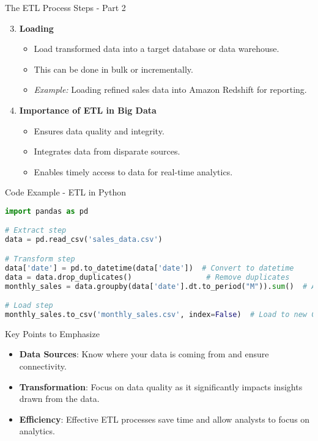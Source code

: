 \documentclass[aspectratio=169]{beamer}
\begin{document}
\begin{frame}{The ETL Process Steps - Part 2}
    \begin{enumerate}
        \setcounter{enumi}{2}
        \item \textbf{Loading}
        \begin{itemize}
            \item Load transformed data into a target database or data warehouse.
            \item This can be done in bulk or incrementally.
            \item \textit{Example:} Loading refined sales data into Amazon Redshift for reporting.
        \end{itemize}

        \item \textbf{Importance of ETL in Big Data}
        \begin{itemize}
            \item Ensures data quality and integrity.
            \item Integrates data from disparate sources.
            \item Enables timely access to data for real-time analytics.
        \end{itemize}

    \end{enumerate}
\end{frame}

\begin{frame}[fragile]{Code Example - ETL in Python}
    \begin{lstlisting}[language=Python]
import pandas as pd

# Extract step
data = pd.read_csv('sales_data.csv')

# Transform step
data['date'] = pd.to_datetime(data['date'])  # Convert to datetime
data = data.drop_duplicates()                 # Remove duplicates
monthly_sales = data.groupby(data['date'].dt.to_period("M")).sum()  # Aggregate monthly

# Load step
monthly_sales.to_csv('monthly_sales.csv', index=False)  # Load to new CSV
    \end{lstlisting}
\end{frame}

\begin{frame}{Key Points to Emphasize}
    \begin{itemize}
        \item \textbf{Data Sources}: Know where your data is coming from and ensure connectivity.
        \item \textbf{Transformation}: Focus on data quality as it significantly impacts insights drawn from the data.
        \item \textbf{Efficiency}: Effective ETL processes save time and allow analysts to focus on analytics.
    \end{itemize}
\end{frame}
\end{document}
